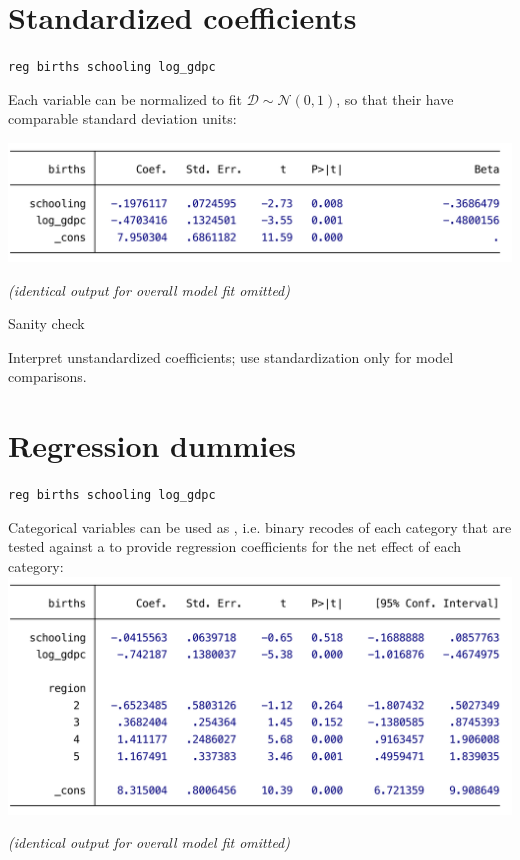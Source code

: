 \documentclass[t]{beamer}
\begin{document}
		\section{Standardized coefficients}

	\begin{frame}[t]{\texttt{reg births schooling log\_gdpc}}

		Each variable can be normalized to fit $\mathcal{D} \sim \mathcal{N}(0,1)$, so that their  have comparable standard deviation units:
		
		\includegraphics[scale=.45]{mreg-output-beta.pdf}

		\footnotesize{\textit{(identical output for overall model fit omitted)}}
		
		\begin{alertblock}{Sanity check}

			Interpret unstandardized coefficients; use standardization only for model comparisons.

		\end{alertblock}

	\end{frame}

		\section{Regression dummies}
			
	\begin{frame}[t]{\texttt{reg births schooling log\_gdpc }}

		Categorical variables can be used as , i.e. binary recodes of each category that are tested against a  to provide regression coefficients for the net effect of each category:\\[.5em]

		\includegraphics[scale=.45]{mreg-output-dummies.pdf}

		\footnotesize{\textit{(identical output for overall model fit omitted)}}

	\end{frame}
\end{document}
